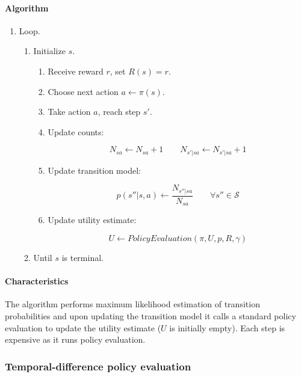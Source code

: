 			\paragraph{Algorithm}
	
			\begin{enumerate}
				\item Loop.
	
					\begin{enumerate}
						\item Initialize $s$.
						
							\begin{enumerate}
								\item Receive reward $r$, set $R(s) = r$.
								\item Choose next action $a\leftarrow\pi(s)$.
								\item Take action $a$, reach step $s'$.
								\item Update counts:
	
									$$N_{sa}\leftarrow N_{sa} + 1\qquad N_{s'|sa}\leftarrow N_{s'|sa}+1$$
	
								\item Update transition model:
	
									$$p(s''|s,a)\leftarrow \frac{N_{s''|sa}}{N_{sa}}\qquad\forall s''\in\mathcal{S}$$
	
								\item Update utility estimate:
	
									$$U\leftarrow PolicyEvaluation(\pi, U, p, R, \gamma)$$
	
							\end{enumerate}
	
						\item Until $s$ is terminal.
					\end{enumerate}
			\end{enumerate}
	
			\paragraph{Characteristics}
			The algorithm performs maximum likelihood estimation of transition probabilities and upon updating the transition model it calls a standard policy evaluation to update the utility estimate ($U$ is initially empty).
			Each step is expensive as it runs policy evaluation.
	
		\subsubsection{Temporal-difference policy evaluation}
	
